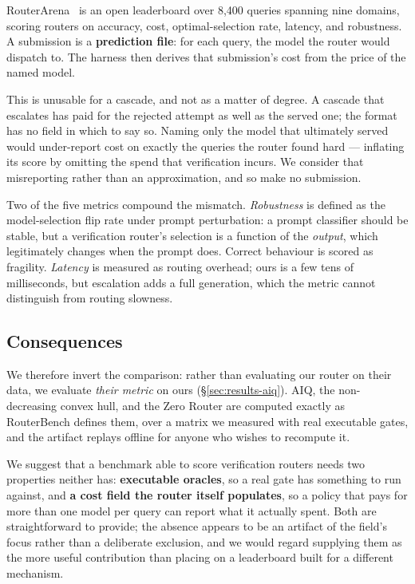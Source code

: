 \documentclass[11pt]{article}
\begin{document}
RouterArena~\cite{routerarena} is an open leaderboard over 8{,}400 queries spanning nine domains,
scoring routers on accuracy, cost, optimal-selection rate, latency, and robustness. A submission is
a \textbf{prediction file}: for each query, the model the router would dispatch to. The harness
then derives that submission's cost from the price of the named model.

This is unusable for a cascade, and not as a matter of degree. A cascade that escalates has paid
for the rejected attempt as well as the served one; the format has no field in which to say so.
Naming only the model that ultimately served would under-report cost on exactly the queries the
router found hard --- inflating its score by omitting the spend that verification incurs. We
consider that misreporting rather than an approximation, and so make no submission.

Two of the five metrics compound the mismatch. \emph{Robustness} is defined as the model-selection
flip rate under prompt perturbation: a prompt classifier should be stable, but a verification
router's selection is a function of the \emph{output}, which legitimately changes when the prompt
does. Correct behaviour is scored as fragility. \emph{Latency} is measured as routing overhead;
ours is a few tens of milliseconds, but escalation adds a full generation, which the metric cannot
distinguish from routing slowness.

\subsection{Consequences}

We therefore invert the comparison: rather than evaluating our router on their data, we evaluate
\emph{their metric} on ours (\S\ref{sec:results-aiq}). AIQ, the non-decreasing convex hull, and the
Zero Router are computed exactly as RouterBench defines them, over a matrix we measured with real
executable gates, and the artifact replays offline for anyone who wishes to recompute it.

We suggest that a benchmark able to score verification routers needs two properties neither has:
\textbf{executable oracles}, so a real gate has something to run against, and \textbf{a cost field
the router itself populates}, so a policy that pays for more than one model per query can report
what it actually spent. Both are straightforward to provide; the absence appears to be an artifact
of the field's focus rather than a deliberate exclusion, and we would regard supplying them as the
more useful contribution than placing on a leaderboard built for a different mechanism.
\end{document}
